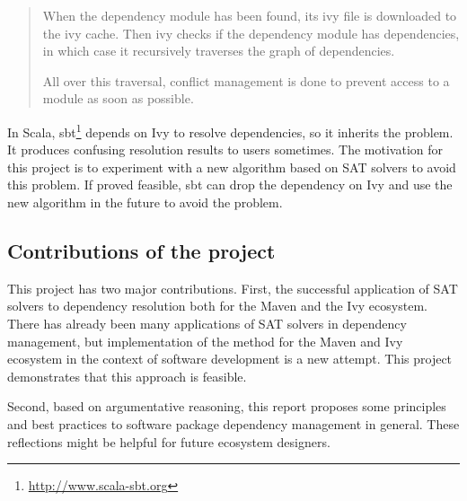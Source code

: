 \begin{quote}
  When the dependency module has been found, its ivy file is downloaded to the ivy cache. Then ivy checks if the dependency module has dependencies, in which case it recursively traverses the graph of dependencies.

  All over this traversal, conflict management is done to prevent access to a module as soon as possible.
\end{quote}

In Scala, sbt\footnote{\url{http://www.scala-sbt.org}} depends on Ivy to resolve dependencies, so it inherits the problem. It produces confusing resolution results to users sometimes. The motivation for this project is to experiment with a new algorithm based on SAT solvers to avoid this problem. If proved feasible, sbt can drop the dependency on Ivy and use the new algorithm in the future to avoid the problem.

\subsection{Contributions of the project}

This project has two major contributions. First, the successful application of SAT solvers to dependency resolution both for the Maven and the Ivy ecosystem. There has already been many applications of SAT solvers in dependency management\cite{mancinelli2006managing, berre2009dependency, vouillon2013software}, but implementation of the method for the Maven and Ivy ecosystem in the context of software development is a new attempt. This project demonstrates that this approach is feasible.

Second, based on argumentative reasoning, this report proposes some principles and best practices to software package dependency management in general. These reflections might be helpful for future ecosystem designers.





